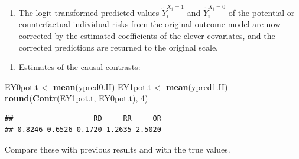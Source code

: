 \documentclass[
]{book}
\newenvironment{Shaded}{\begin{snugshade}}{\end{snugshade}}
\newcommand{\DecValTok}[1]{\textcolor[rgb]{0.00,0.00,0.81}{#1}}
\newcommand{\FunctionTok}[1]{\textcolor[rgb]{0.13,0.29,0.53}{\textbf{#1}}}
\newcommand{\NormalTok}[1]{#1}
\newcommand{\OtherTok}[1]{\textcolor[rgb]{0.56,0.35,0.01}{#1}}
\newcommand{\SpecialCharTok}[1]{\textcolor[rgb]{0.81,0.36,0.00}{\textbf{#1}}}
\providecommand{\tightlist}{%
  \setlength{\itemsep}{0pt}\setlength{\parskip}{0pt}}
\begin{document}
\begin{enumerate}
\def\labelenumi{\arabic{enumi}.}
\setcounter{enumi}{2}
\tightlist
\item
  The logit-transformed predicted values \(\widetilde{Y}_i^{X_i=1}\) and
  \(\widetilde{Y}_i^{X_i=0}\) of
  the potential or counterfactual individual risks from
  the original outcome model are now corrected by the estimated
  coefficients of the clever covariates, and the corrected
  predictions are returned to the original scale.
\end{enumerate}

\begin{Shaded}
\end{Shaded}

\begin{enumerate}
\def\labelenumi{\arabic{enumi}.}
\setcounter{enumi}{3}
\tightlist
\item
  Estimates of the causal contrasts:
\end{enumerate}

\begin{Shaded}
\begin{Highlighting}[]
\NormalTok{EY0pot.t }\OtherTok{\textless{}{-}} \FunctionTok{mean}\NormalTok{(ypred0.H)}
\NormalTok{EY1pot.t }\OtherTok{\textless{}{-}} \FunctionTok{mean}\NormalTok{(ypred1.H)}
\FunctionTok{round}\NormalTok{(}\FunctionTok{Contr}\NormalTok{(EY1pot.t, EY0pot.t), }\DecValTok{4}\NormalTok{)}
\end{Highlighting}
\end{Shaded}

\begin{verbatim}
##                   RD     RR     OR 
## 0.8246 0.6526 0.1720 1.2635 2.5020
\end{verbatim}

Compare these with previous results and with the true values.
\end{document}

